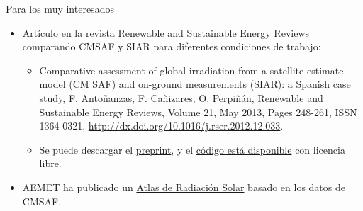 \documentclass[xcolor={usenames,svgnames,dvipsnames}]{beamer}
\begin{document}
\begin{frame}[label=sec-4-4]{Para los muy interesados}
\begin{itemize}
\item Artículo en la revista Renewable and Sustainable Energy Reviews
comparando CMSAF y SIAR para diferentes condiciones de trabajo:
\begin{itemize}
\item Comparative assessment of global irradiation from a satellite
estimate model (CM SAF) and on-ground measurements (SIAR): a
Spanish case study, F. Antoñanzas, F. Cañizares, O. Perpiñán, Renewable
and Sustainable Energy Reviews, Volume 21, May 2013, Pages 248-261,
ISSN 1364-0321, \url{http://dx.doi.org/10.1016/j.rser.2012.12.033}.
\item Se puede descargar el \href{http://procomun.files.wordpress.com/2012/12/cmsaf_siar_rev1.pdf}{preprint}, y el \href{https://github.com/oscarperpinan/CMSAF-SIAR}{código está disponible} con
licencia libre.
\end{itemize}
\item AEMET ha publicado un \href{http://www.aemet.es/es/noticias/2012/05/atlasradiacionsolar}{Atlas de Radiación Solar} basado en los datos
de CMSAF.
\end{itemize}
\end{frame}
\end{document}
